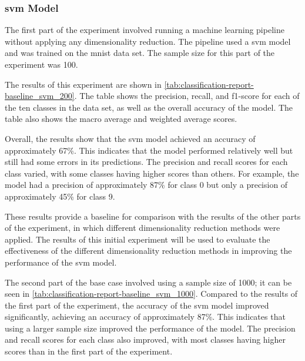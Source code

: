 \subsubsection{svm Model}\label{subsubsec:experiment_4_no_dimmensionality_reduction}





The first part of the experiment involved running a machine learning pipeline without applying any dimensionality reduction. The pipeline used a \gls{svm} model and was trained on the \gls{mnist} data set. The sample size for this part of the experiment was 100.

The results of this experiment are shown in \ref{tab:classification-report-baseline_svm_200}. The table shows the precision, recall, and f1-score for each of the ten classes in the data set, as well as the overall accuracy of the model. The table also shows the macro average and weighted average scores.

Overall, the results show that the \gls{svm} model achieved an accuracy of approximately 67\%. This indicates that the model performed relatively well but still had some errors in its predictions. The precision and recall scores for each class varied, with some classes having higher scores than others. For example, the model had a precision of approximately 87\% for class 0 but only a precision of approximately 45\% for class 9.

These results provide a baseline for comparison with the results of the other parts of the experiment, in which different dimensionality reduction methods were applied. The results of this initial experiment will be used to evaluate the effectiveness of the different dimensionality reduction methods in improving the performance of the \gls{svm} model.

The second part of the base case involved using a sample size of 1000; it can be seen in \ref{tab:classification-report-baseline_svm_1000}. Compared to the results of the first part of the experiment, the accuracy of the \gls{svm} model improved significantly, achieving an accuracy of approximately 87\%. This indicates that using a larger sample size improved the performance of the model. The precision and recall scores for each class also improved, with most classes having higher scores than in the first part of the experiment.

